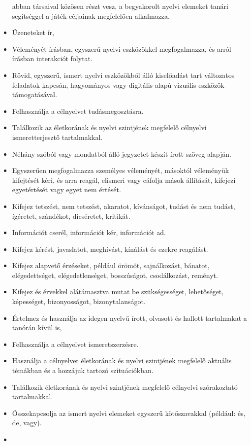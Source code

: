 \begin{itemize}
  abban társaival közösen részt vesz, a begyakorolt nyelvi elemeket
  tanári segítséggel a játék céljainak megfelelően alkalmazza.
\item
  Üzeneteket ír,
\item
  Véleményét írásban, egyszerű nyelvi eszközökkel megfogalmazza, és
  arról írásban interakciót folytat.
\item
  Rövid, egyszerű, ismert nyelvi eszközökből álló kiselőadást tart
  változatos feladatok kapcsán, hagyományos vagy digitális alapú
  vizuális eszközök támogatásával.
\item
  Felhasználja a célnyelvet tudásmegosztásra.
\item
  Találkozik az életkorának és nyelvi szintjének megfelelő célnyelvi
  ismeretterjesztő tartalmakkal.
\item
  Néhány szóból vagy mondatból álló jegyzetet készít írott szöveg
  alapján.
\item
  Egyszerűen megfogalmazza személyes véleményét, másoktól véleményük
  kifejtését kéri, és arra reagál, elismeri vagy cáfolja mások
  állítását, kifejezi egyetértését vagy egyet nem értését.
\item
  Kifejez tetszést, nem tetszést, akaratot, kívánságot, tudást és nem
  tudást, ígéretet, szándékot, dicséretet, kritikát.
\item
  Információt cserél, információt kér, információt ad.
\item
  Kifejez kérést, javaslatot, meghívást, kínálást és ezekre reagálást.
\item
  Kifejez alapvető érzéseket, például örömöt, sajnálkozást, bánatot,
  elégedettséget, elégedetlenséget, bosszúságot, csodálkozást, reményt.
\item
  Kifejez és érvekkel alátámasztva mutat be szükségességet, lehetőséget,
  képességet, bizonyosságot, bizonytalanságot.
\item
  Értelmez és használja az idegen nyelvű írott, olvasott és hallott
  tartalmakat a tanórán kívül is,
\item
  Felhasználja a célnyelvet ismeretszerzésre.
\item
  Használja a célnyelvet életkorának és nyelvi szintjének megfelelő
  aktuális témákban és a hozzájuk tartozó szituációkban.
\item
  Találkozik életkorának és nyelvi szintjének megfelelő célnyelvi
  szórakoztató tartalmakkal.
\item
  Összekapcsolja az ismert nyelvi elemeket egyszerű kötőszavakkal
  (például: és, de, vagy).
\item

\end{itemize}
